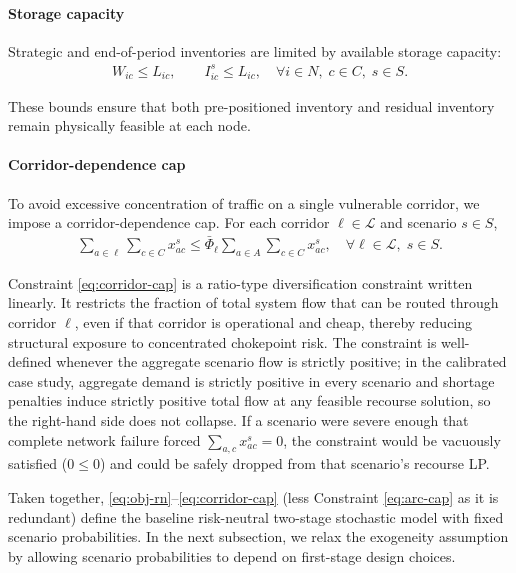 \documentclass[final,3p,authoryear]{elsarticle}
\theoremstyle{definition}
\begin{document}
\paragraph{Storage capacity}
Strategic and end-of-period inventories are limited by available storage
capacity:
\begin{align}
W_{ic} \le L_{ic}, \qquad
I_{ic}^{s} \le L_{ic},
\quad \forall i \in N,\; c \in C,\; s \in S.
\label{eq:storage}
\end{align}

These bounds ensure that both pre-positioned inventory and residual
inventory remain physically feasible at each node.

\paragraph{Corridor-dependence cap}
To avoid excessive concentration of traffic on a single vulnerable
corridor, we impose a corridor-dependence cap. For each corridor
$\ell \in \mathcal L$ and scenario $s \in S$,
\begin{align}
\sum_{a \in \ell}\sum_{c \in C} x_{ac}^{s}
\le
\bar\Phi_\ell
\sum_{a \in A}\sum_{c \in C} x_{ac}^{s},
\quad \forall \ell \in \mathcal L,\; s \in S.
\label{eq:corridor-cap}
\end{align}

Constraint \eqref{eq:corridor-cap} is a ratio-type diversification
constraint written linearly. It restricts the fraction of total system
flow that can be routed through corridor $\ell$, even if that corridor
is operational and cheap, thereby reducing structural exposure to
concentrated chokepoint risk. The constraint is well-defined whenever
the aggregate scenario flow is strictly positive; in the calibrated
case study, aggregate demand is strictly positive in every scenario and
shortage penalties induce strictly positive total flow at any feasible
recourse solution, so the right-hand side does not collapse. If a
scenario were severe enough that complete network failure forced
$\sum_{a,c} x_{ac}^{s} = 0$, the constraint would be vacuously satisfied
($0 \leq 0$) and could be safely dropped from that scenario's recourse
LP.

Taken together, \eqref{eq:obj-rn}--\eqref{eq:corridor-cap} (less Constraint \eqref{eq:arc-cap} as it is redundant) define the
baseline risk-neutral two-stage stochastic model with fixed scenario
probabilities. In the next subsection, we relax the exogeneity
assumption by allowing scenario probabilities to depend on first-stage
design choices.
\end{document}
